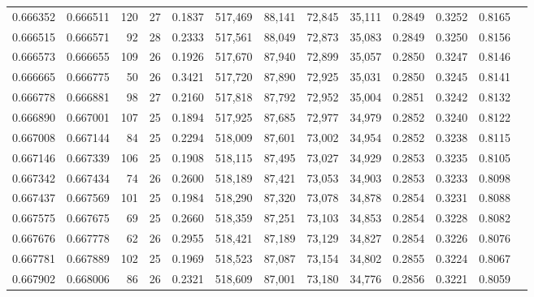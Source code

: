 \begin{tabular}{rrrrrrrrrrrrr}
0.666352 & 0.666511 &   120 &  27 &                                     0.1837 & 517,469 &  88,141 &  72,845 &  35,111 & 0.2849 & 0.3252 & 0.8165 \\
0.666515 & 0.666571 &    92 &  28 &                                     0.2333 & 517,561 &  88,049 &  72,873 &  35,083 & 0.2849 & 0.3250 & 0.8156 \\
0.666573 & 0.666655 &   109 &  26 &                                     0.1926 & 517,670 &  87,940 &  72,899 &  35,057 & 0.2850 & 0.3247 & 0.8146 \\
0.666665 & 0.666775 &    50 &  26 &                                     0.3421 & 517,720 &  87,890 &  72,925 &  35,031 & 0.2850 & 0.3245 & 0.8141 \\
0.666778 & 0.666881 &    98 &  27 &                                     0.2160 & 517,818 &  87,792 &  72,952 &  35,004 & 0.2851 & 0.3242 & 0.8132 \\
0.666890 & 0.667001 &   107 &  25 &                                     0.1894 & 517,925 &  87,685 &  72,977 &  34,979 & 0.2852 & 0.3240 & 0.8122 \\
0.667008 & 0.667144 &    84 &  25 &                                     0.2294 & 518,009 &  87,601 &  73,002 &  34,954 & 0.2852 & 0.3238 & 0.8115 \\
0.667146 & 0.667339 &   106 &  25 &                                     0.1908 & 518,115 &  87,495 &  73,027 &  34,929 & 0.2853 & 0.3235 & 0.8105 \\
0.667342 & 0.667434 &    74 &  26 &                                     0.2600 & 518,189 &  87,421 &  73,053 &  34,903 & 0.2853 & 0.3233 & 0.8098 \\
0.667437 & 0.667569 &   101 &  25 &                                     0.1984 & 518,290 &  87,320 &  73,078 &  34,878 & 0.2854 & 0.3231 & 0.8088 \\
0.667575 & 0.667675 &    69 &  25 &                                     0.2660 & 518,359 &  87,251 &  73,103 &  34,853 & 0.2854 & 0.3228 & 0.8082 \\
0.667676 & 0.667778 &    62 &  26 &                                     0.2955 & 518,421 &  87,189 &  73,129 &  34,827 & 0.2854 & 0.3226 & 0.8076 \\
0.667781 & 0.667889 &   102 &  25 &                                     0.1969 & 518,523 &  87,087 &  73,154 &  34,802 & 0.2855 & 0.3224 & 0.8067 \\
0.667902 & 0.668006 &    86 &  26 &                                     0.2321 & 518,609 &  87,001 &  73,180 &  34,776 & 0.2856 & 0.3221 & 0.8059 \\

\end{tabular}
